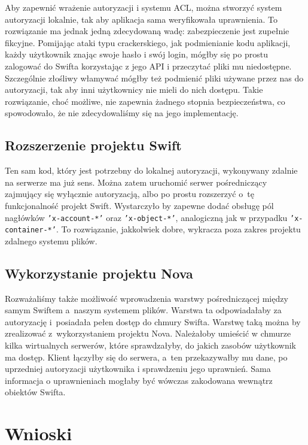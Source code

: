 	Aby zapewnić wrażenie autoryzacji i systemu ACL, można stworzyć system autoryzacji lokalnie, tak aby aplikacja sama weryfikowała uprawnienia. To rozwiązanie ma jednak jedną zdecydowaną wadę: zabezpieczenie jest zupełnie fikcyjne. Pomijając ataki typu crackerskiego, jak podmienianie kodu aplikacji, każdy użytkownik znając swoje hasło i swój login, mógłby się po prostu zalogować do Swifta korzystając z jego API i przeczytać pliki mu niedostępne. Szczególnie złośliwy włamywać mógłby też podmienić pliki używane przez nas do autoryzacji, tak aby inni użytkownicy nie mieli do nich dostępu. Takie rozwiązanie, choć możliwe, nie zapewnia żadnego stopnia bezpieczeństwa, co spowodowało, że nie zdecydowaliśmy się na jego implementację.

	\subsection{Rozszerzenie projektu Swift}\label{sub:rozszerzenie projektu swift}

	Ten sam kod, który jest potrzebny do lokalnej autoryzacji, wykonywany zdalnie na serwerze ma już sens. Można zatem uruchomić serwer pośredniczący zajmujący się wyłącznie autoryzacją, albo po prostu rozszerzyć o~tę funkcjonalność projekt Swift. Wystarczyło by zapewne dodać obsługę pól nagłówków \texttt{'x-account-*'} oraz \texttt{'x-object-*'}, analogiczną jak w przypadku \texttt{'x-container-*'}. To rozwiązanie, jakkolwiek dobre, wykracza poza zakres projektu zdalnego systemu plików.
	
	\subsection{Wykorzystanie projektu Nova}\label{sub:wykorzystanie projektu nova}

    Rozważaliśmy także możliwość wprowadzenia warstwy pośredniczącej między samym Swiftem a~naszym systemem plików. Warstwa ta odpowiadałaby za autoryzację i~posiadała pełen dostęp do chmury Swifta. Warstwę taką można by zrealizować z~wykorzystaniem projektu Nova. Należałoby umieścić w chmurze kilka wirtualnych serwerów, które sprawdzałyby, do jakich zasobów użytkownik ma dostęp. Klient łączyłby się do serwera, a~ten przekazywałby mu dane, po uprzedniej autoryzacji użytkownika i sprawdzeniu jego uprawnień. Sama informacja o uprawnieniach mogłaby być wówczas zakodowana wewnątrz obiektów Swifta.
	
	\section{Wnioski}\label{sec:wnioski}

